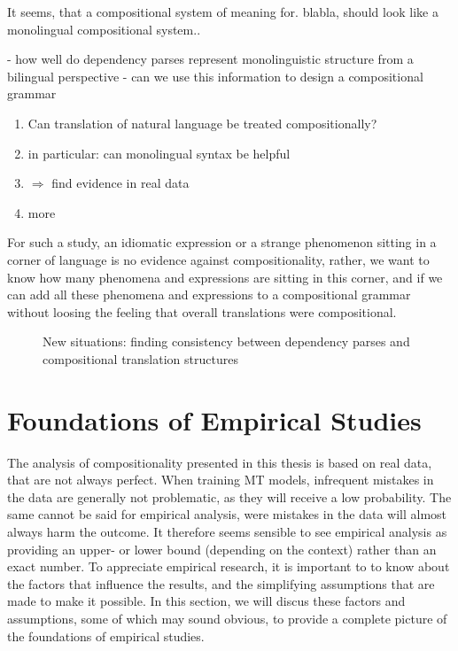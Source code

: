 \documentclass{report}
\begin{document}
It seems, that a compositional system of meaning for. blabla, should look like a monolingual compositional system.. 

- how well do dependency parses represent monolinguistic structure from a bilingual perspective
- can we use this information to design a compositional grammar

\begin{enumerate}
\item Can translation of natural language be treated compositionally?
\item in particular: can monolingual syntax be helpful
\item $\Rightarrow$ find evidence in real data
\item more
\end{enumerate}


For such a study, an idiomatic expression or a strange phenomenon sitting in a corner of language is no evidence against compositionality, rather, we want to know how many phenomena and expressions are sitting in this corner, and if we can add all these phenomena and expressions to a compositional grammar without loosing the feeling that overall translations were compositional.

\begin{figure}[!ht]
\centering

\caption{New situations: finding consistency between dependency parses and compositional translation structures}\label{fig:depshats}
\end{figure}

\section{Foundations of Empirical Studies}
\label{sec:assumptions}

The analysis of compositionality presented in this thesis is based on real data, that are not always perfect. When training MT models, infrequent mistakes in the data are generally not problematic, as they will receive a low probability. The same cannot be said for empirical analysis, were mistakes in the data will almost always harm the outcome. It therefore seems sensible to see empirical analysis as providing an upper- or lower bound (depending on the context) rather than an exact number. To appreciate empirical research, it is important to to know about the factors that influence the results, and the simplifying assumptions that are made to make it possible. In this section, we will discus these factors and assumptions, some of which may sound obvious, to provide a complete picture of the foundations of empirical studies.
\end{document}
